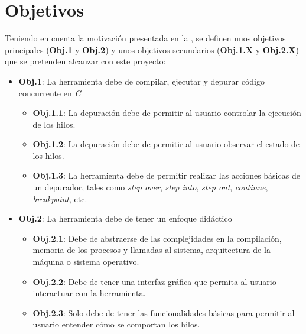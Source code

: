 \section{Objetivos}\label{sec:objetivos}
Teniendo en cuenta la motivación presentada en la , se definen unos objetivos principales (\textbf{Obj.1} y \textbf{Obj.2}) y unos objetivos secundarios (\textbf{Obj.1.X} y \textbf{Obj.2.X}) que se pretenden alcanzar con este proyecto:
\begin{itemize}

    \item \textbf{Obj.1}: La herramienta debe de compilar, ejecutar y depurar código concurrente en \textit{C}
    \begin{itemize}
        \item \textbf{Obj.1.1}: La depuración debe de permitir al usuario controlar la ejecución de los hilos.
        \item \textbf{Obj.1.2}: La depuración debe de permitir al usuario observar el estado de los hilos.
        \item \textbf{Obj.1.3}: La herramienta debe de permitir realizar las acciones básicas de un depurador, tales como \textit{step over}, \textit{step into}, \textit{step out}, \textit{continue}, \textit{breakpoint}, etc.
    \end{itemize}
     
    \item \textbf{Obj.2}: La herramienta debe de tener un enfoque didáctico\label{obj:didactico}
    \begin{itemize}
        \item \textbf{Obj.2.1}: Debe de abstraerse de las complejidades en la compilación, memoria de los procesos y llamadas al sistema, arquitectura de la máquina o sistema operativo.
        \item \textbf{Obj.2.2}: Debe de tener una \gls{interfaz gráfica} que permita al usuario interactuar con la herramienta.
        \item \textbf{Obj.2.3}: Solo debe de tener las funcionalidades básicas para permitir al usuario entender cómo se comportan los hilos.
    \end{itemize}

\end{itemize}

